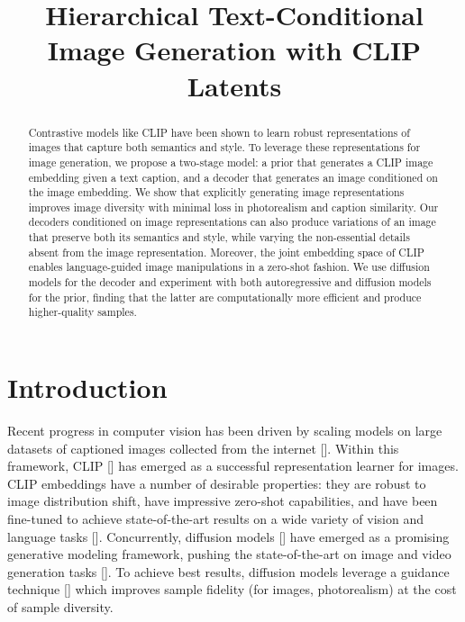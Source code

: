 \title{Hierarchical Text-Conditional Image Generation with CLIP Latents}

\begin{abstract}
Contrastive models like CLIP have been shown to learn robust representations of images that capture both semantics and style. To leverage these representations for image generation, we propose a two-stage model: a prior that generates a CLIP image embedding given a text caption, and a decoder that generates an image conditioned on the image embedding. We show that explicitly generating image representations improves image diversity with minimal loss in photorealism and caption similarity. Our decoders conditioned on image representations can also produce variations of an image that preserve both its semantics and style, while varying the non-essential details absent from the image representation. Moreover, the joint embedding space of CLIP enables language-guided image manipulations in a zero-shot fashion. We use diffusion models for the decoder and experiment with both autoregressive and diffusion models for the prior, finding that the latter are computationally more efficient and produce higher-quality samples.
\end{abstract}

\section{Introduction}

Recent progress in computer vision has been driven by scaling models on large datasets of captioned images collected from the internet []. Within this framework, CLIP [] has emerged as a successful representation learner for images. CLIP embeddings have a number of desirable properties: they are robust to image distribution shift, have impressive zero-shot capabilities, and have been fine-tuned to achieve state-of-the-art results on a wide variety of vision and language tasks []. Concurrently, diffusion models [] have emerged as a promising generative modeling framework, pushing the state-of-the-art on image and video generation tasks []. To achieve best results, diffusion models leverage a guidance technique [] which improves sample fidelity (for images, photorealism) at the cost of sample diversity.

